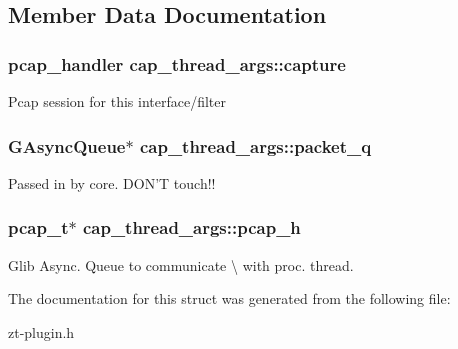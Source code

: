 \subsection{Member Data Documentation}
\hypertarget{structcap__thread__args_aa797d2a4089940a8d75083f4c22dadee}{
\subsubsection[{capture}]{\setlength{\rightskip}{0pt plus 5cm}pcap\-\_\-handler cap\-\_\-thread\-\_\-args\-::capture}}\label{structcap__thread__args_aa797d2a4089940a8d75083f4c22dadee}
Pcap session for this interface/filter \hypertarget{structcap__thread__args_a48a9654ac9d6c95abfffdebd261df927}{
\subsubsection[{packet\-\_\-q}]{\setlength{\rightskip}{0pt plus 5cm}G\-Async\-Queue$\ast$ cap\-\_\-thread\-\_\-args\-::packet\-\_\-q}}\label{structcap__thread__args_a48a9654ac9d6c95abfffdebd261df927}
Passed in by core. D\-O\-N'T touch!! \hypertarget{structcap__thread__args_ac1729201a36634018f35f509ac884478}{
\subsubsection[{pcap\-\_\-h}]{\setlength{\rightskip}{0pt plus 5cm}pcap\-\_\-t$\ast$ cap\-\_\-thread\-\_\-args\-::pcap\-\_\-h}}\label{structcap__thread__args_ac1729201a36634018f35f509ac884478}
Glib Async. Queue to communicate \textbackslash{} with proc. thread. 

The documentation for this struct was generated from the following file\-:\begin{DoxyCompactItemize}
\item 
zt-\/plugin.\-h\end{DoxyCompactItemize}
